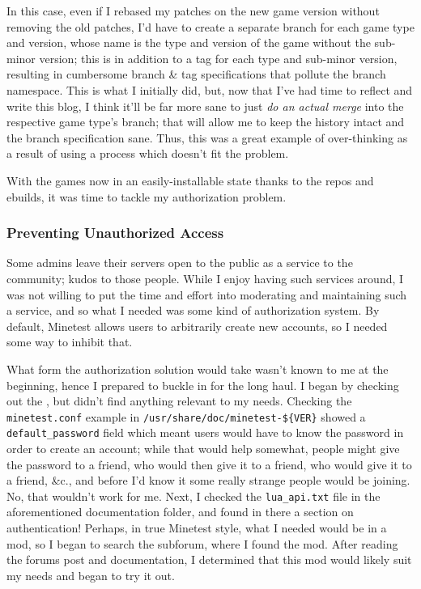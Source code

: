 \documentclass{article}
\begin{document}
In this case, even if I rebased my patches on the new game version without removing the old patches, I'd have to create a separate branch for each game type and version, whose name is the type and version of the game without the sub-minor version; this is in addition to a tag for each type and sub-minor version, resulting in cumbersome branch \& tag specifications that pollute the branch namespace.  This is what I initially did, but, now that I've had time to reflect and write this blog, I think it'll be far more sane to just \emph{do an actual merge} into the respective game type's branch; that will allow me to keep the history intact and the branch specification sane.  Thus, this was a great example of over-thinking as a result of using a process which doesn't fit the problem.

With the games now in an easily-installable state thanks to the repos and ebuilds, it was time to tackle my authorization problem.

\subsubsection{Preventing Unauthorized Access}
Some admins leave their servers open to the public as a service to the community; kudos to those people.  While I enjoy having such services around, I was not willing to put the time and effort into moderating and maintaining such a service, and so what I needed was some kind of authorization system.  By default, Minetest allows users to arbitrarily create new accounts, so I needed some way to inhibit that.

What form the authorization solution would take wasn't known to me at the beginning, hence I prepared to buckle in for the long haul.  I began by checking out the , but didn't find anything relevant to my needs.  Checking the \texttt{minetest.conf} example in \verb|/usr/share/doc/minetest-${VER}| showed a \texttt{default_password} field which meant users would have to know the password in order to create an account; while that would help somewhat, people might give the password to a friend, who would then give it to a friend, who would give it to a friend, \&c., and before I'd know it some really strange people would be joining.  No, that wouldn't work for me.  Next, I checked the \texttt{lua_api.txt} file in the aforementioned documentation folder, and found in there a section on authentication!  Perhaps, in true Minetest style, what I needed would be in a mod, so I began to search the  subforum, where I found the  mod.  After reading the forums post and documentation, I determined that this mod would likely suit my needs and began to try it out.
\end{document}

